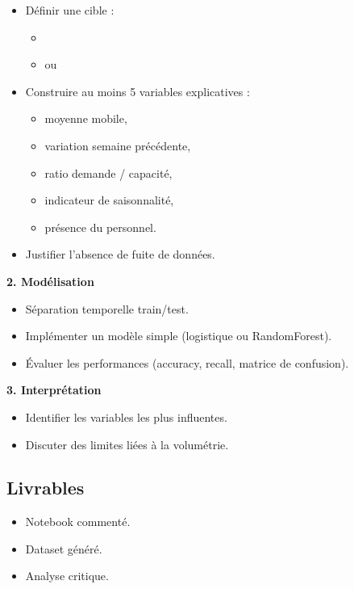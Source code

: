 \documentclass[11pt,a4paper]{article}
\begin{document}
\begin{itemize}
  \item Définir une cible :
  \begin{itemize}
    \item {}
    \item ou 
  \end{itemize}
  \item Construire au moins 5 variables explicatives :
  \begin{itemize}
    \item moyenne mobile,
    \item variation semaine précédente,
    \item ratio demande / capacité,
    \item indicateur de saisonnalité,
    \item présence du personnel.
  \end{itemize}
  \item Justifier l’absence de fuite de données.
\end{itemize}

\textbf{2. Modélisation}

\begin{itemize}
  \item Séparation temporelle train/test.
  \item Implémenter un modèle simple (logistique ou RandomForest).
  \item Évaluer les performances (accuracy, recall, matrice de confusion).
\end{itemize}

\textbf{3. Interprétation}

\begin{itemize}
  \item Identifier les variables les plus influentes.
  \item Discuter des limites liées à la volumétrie.
\end{itemize}

\subsection*{Livrables}

\begin{itemize}
  \item Notebook commenté.
  \item Dataset généré.
  \item Analyse critique.
\end{itemize}
\end{document}
